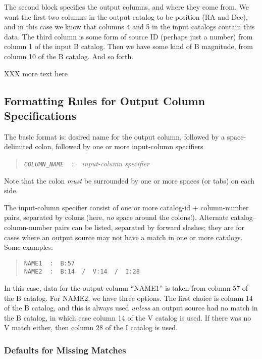 \documentclass[10pt]{article}
\begin{document}
The second block specifies the output columns, and where they come
from.  We want the first two columns in the output catalog to be
position (RA and Dec), and in this case we know that columns 4 and 5
in the input catalogs contain this data.  The third column is some
form of source ID (perhaps just a number) from column 1 of the input B
catalog.  Then we have some kind of B magnitude, from column 10 of the
B catalog.  And so forth.


XXX more text here

\subsection{Formatting Rules for Output Column Specifications}

The basic format is: desired name for the output column, followed by a
space-delimited colon, followed by one or more input-column specifiers

\begin{quote}
  \texttt{{\sl COLUMN\_NAME}  ~:~   }\textit{input-column specifier}
\end{quote}

Note that the colon \textit{must} be surrounded by one or more spaces
(or tabs) on each side.

The input-column specifier consist of one or more catalog-id + 
column-number pairs, separated by colons (here, \textit{no} space 
around the colons!).  Alternate catalog--column-number pairs can be 
listed, separated by forward slashes; they are for cases where an 
output source may not have a match in one or more catalogs.  Some 
examples:

\begin{quote}
  \texttt{NAME1  ~:~   B:57} \\
  \texttt{NAME2  ~:~   B:14~ /~ V:14~ /~ I:28}
\end{quote}
In this case, data for the output column ``NAME1'' is taken from
column 57 of the B catalog.  For NAME2, we have three options.  The
first choice is column 14 of the B catalog, and this is always used
\textit{unless} an output source had no match in the B catalog, in
which case column 14 of the V catalog is used.  If there was no V
match either, then column 28 of the I catalog is used.


\subsubsection{Defaults for Missing Matches}
\end{document}
